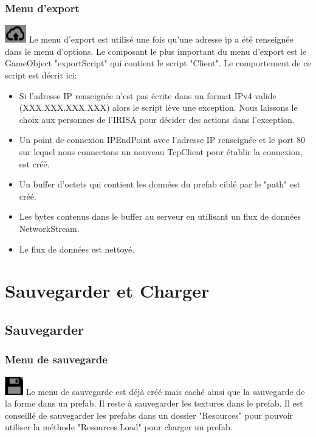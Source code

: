 \documentclass[a4paper,11pt]{article}
\begin{document}
		\subsubsection{Menu d'export}
		\includegraphics[scale=0.9]{./images/export.png} Le menu d'export est utilisé une fois qu'une adresse ip a été renseignée dans le menu d'options.
			Le composant le plus important du menu d'export est le GameObject "exportScript" qui contient le script "Client".
			Le comportement de ce script est décrit ici:
			\begin{itemize}
				\item Si l'adresse IP renseignée n'est pas écrite dans un format IPv4 valide (XXX.XXX.XXX.XXX) alors le script lève une exception. Nous laissons le choix aux personnes de l'IRISA pour décider des actions dans l'exception.
				\item Un point de connexion IPEndPoint avec l'adresse IP renseignée et le port 80 sur lequel nous connectons un nouveau TcpClient pour établir la connexion, est créé.
				\item Un buffer d'octets qui contient les données du prefab ciblé par le "path" est créé.
				\item Les bytes contenus dans le buffer au serveur en utilisant un flux de données NetworkStream.
				\item Le flux de données est nettoyé.
			\end{itemize}

\section{Sauvegarder et Charger}
	\subsection{Sauvegarder}
		\subsubsection{Menu de sauvegarde}
		\includegraphics[scale=1]{./images/save.png} Le menu de sauvegarde est déjà créé mais caché ainsi que la sauvegarde de la forme dans un prefab. Il reste à sauvegarder les textures dans le prefab. Il est conseillé de sauvegarder les prefabs dans un dossier "Resources" pour pouvoir utiliser la méthode "Resources.Load" pour charger un prefab.
\end{document}
